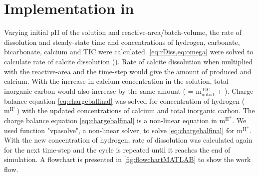 \section{Implementation in \MATLAB}
Varying initial pH of the solution and reactive-area/batch-volume, the rate of dissolution and steady-state time and 
concentrations of hydrogen, carbonate, bicarbonate, calcium and TIC were calculated. \cref{eq:rDiss,eq:omega} were solved 
to calculate rate of calcite dissolution (). Rate of calcite dissolution when multiplied with the reactive-area 
and the time-step would give the amount of produced  and calcium. With the increase in calcium concentration in the 
solution, total inorganic carbon would also increase by the same amount ( = $\mathrm{m_{initial}^{TIC}}$ + ). 
Charge balance equation \ref{eq:chargebalfinal} was solved for concentration of hydrogen ($\mathrm{m^{H^{+}}}$) with the updated concentrations 
of calcium and total inorganic carbon. The charge balance equation \ref{eq:chargebalfinal} is a non-linear equation in $\mathrm{m^{H^+}}$. 
We used \MATLAB function "vpasolve", a non-linear solver, to solve \cref{eq:chargebalfinal} for $\mathrm{m^{H^+}}$. With the new 
concentration of hydrogen, rate of dissolution was calculated again for the next time-step and the cycle is repeated until it 
reaches the end of simulation. A flowchart is presented in \cref{fig:flowchartMATLAB} to show the work flow. 


